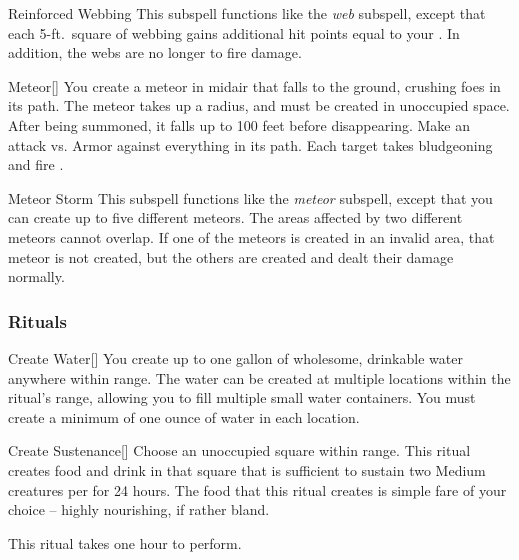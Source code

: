 \begin{ability}[\nth{3}]{Reinforced Webbing}
This subspell functions like the \textit{web} subspell, except that each 5-ft.\ square of webbing gains additional hit points equal to your .
In addition, the webs are no longer  to fire damage.
\end{ability}
\vspace{0.25em}



\begin{ability}[\nth{4}]{Meteor}[]
You create a meteor in midair that falls to the ground, crushing foes in its path.
The meteor takes up a \areamed radius, and must be created in unoccupied space.
After being summoned, it falls up to 100 feet before disappearing.
Make an attack vs. Armor against everything in its path.
\hit Each target takes bludgeoning and fire .
\end{ability}
\vspace{0.25em}



\begin{ability}[\nth{6}]{Meteor Storm}
This subspell functions like the \textit{meteor} subspell, except that you can create up to five different meteors.
The areas affected by two different meteors cannot overlap.
If one of the meteors is created in an invalid area, that meteor is not created, but the others are created and dealt their damage normally.
\end{ability}
\vspace{0.25em}



\subsubsection{Rituals}


\begin{ability}[\nth{1}]{Create Water}[]
You create up to one gallon of wholesome, drinkable water anywhere within \rngclose range.
The water can be created at multiple locations within the ritual's range, allowing you to fill multiple small water containers.
You must create a minimum of one ounce of water in each location.
\end{ability}
\vspace{0.25em}



\begin{ability}[\nth{2}]{Create Sustenance}[]
Choose an unoccupied square within \rngclose range.
This ritual creates food and drink in that square that is sufficient to sustain two Medium creatures per  for 24 hours.
The food that this ritual creates is simple fare of your choice -- highly nourishing, if rather bland.

This ritual takes one hour to perform.
\end{ability}
\vspace{0.25em}



